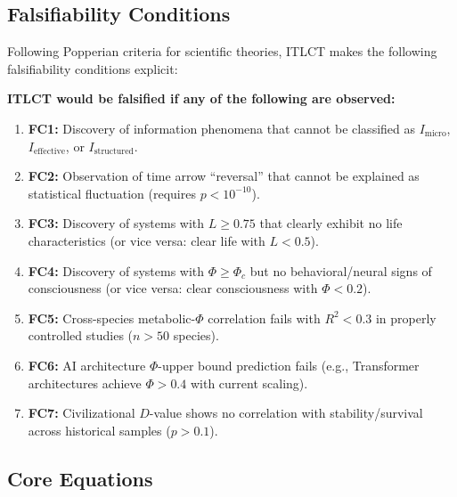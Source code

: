 \documentclass[12pt,a4paper]{article}
\begin{document}
\subsection{Falsifiability Conditions}

Following Popperian criteria for scientific theories, ITLCT makes the following falsifiability conditions explicit:

\begin{tcolorbox}[title=\textbf{Falsifiability Conditions}]
\textbf{ITLCT would be falsified if any of the following are observed:}

\begin{enumerate}
\item \textbf{FC1:} Discovery of information phenomena that cannot be classified as $I_{\text{micro}}$, $I_{\text{effective}}$, or $I_{\text{structured}}$.

\item \textbf{FC2:} Observation of time arrow ``reversal'' that cannot be explained as statistical fluctuation (requires $p < 10^{-10}$).

\item \textbf{FC3:} Discovery of systems with $L \geq 0.75$ that clearly exhibit no life characteristics (or vice versa: clear life with $L < 0.5$).

\item \textbf{FC4:} Discovery of systems with $\Phi \geq \Phi_c$ but no behavioral/neural signs of consciousness (or vice versa: clear consciousness with $\Phi < 0.2$).

\item \textbf{FC5:} Cross-species metabolic-$\Phi$ correlation fails with $R^2 < 0.3$ in properly controlled studies ($n > 50$ species).

\item \textbf{FC6:} AI architecture $\Phi$-upper bound prediction fails (e.g., Transformer architectures achieve $\Phi > 0.4$ with current scaling).

\item \textbf{FC7:} Civilizational $D$-value shows no correlation with stability/survival across historical samples ($p > 0.1$).
\end{enumerate}
\end{tcolorbox}

\subsection{Core Equations}
\end{document}
